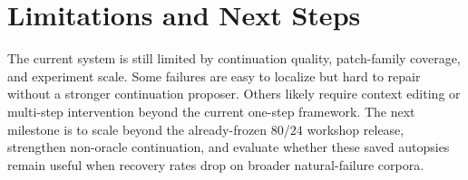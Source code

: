 \documentclass[11pt]{article}
\begin{document}
\section{Limitations and Next Steps}

The current system is still limited by continuation quality, patch-family
coverage, and experiment scale. Some failures are easy to localize but hard to
repair without a stronger continuation proposer. Others likely require context
editing or multi-step intervention beyond the current one-step framework. The
next milestone is to scale beyond the already-frozen $80$/$24$ workshop
release, strengthen non-oracle continuation, and evaluate whether these saved
autopsies remain useful when recovery rates drop on broader natural-failure
corpora.



\end{document}
